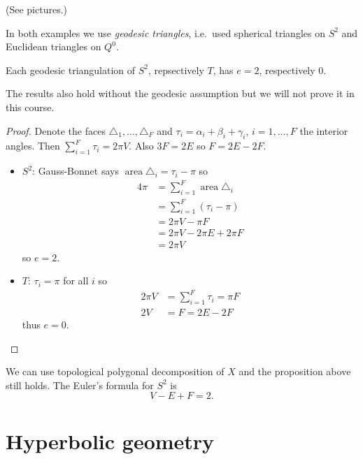 \documentclass[a4paper]{article}
\theoremstyle{definition}
\begin{document}
\begin{eg}
  (See pictures.)

  In both examples we use \emph{geodesic triangles}, i.e.\ used spherical triangles on \(S^2\) and Euclidean triangles on \(Q^0\).
\end{eg}

\begin{proposition}
  Each geodesic triangulation of \(S^2\), repsectively \(T\), has \(e = 2\), respectively \(0\).
\end{proposition}

\begin{remark}
  The results also hold without the geodesic assumption but we will not prove it in this course.
\end{remark}

\begin{proof}
  Denote the faces \(\triangle_1, \dots, \triangle_F\) and \(\tau_i = \alpha_i + \beta_i + \gamma_i\), \(i = 1, \dots, F\) the interior angles. Then \(\sum_{i = 1}^F \tau_i = 2\pi V\). Also \(3F = 2E\) so \(F = 2E - 2F\).
  \begin{itemize}
  \item \(S^2\): Gauss-Bonnet says \(\operatorname{area} \triangle_i = \tau_i - \pi\) so
    \begin{align*}
      4\pi
      &= \sum_{i = 1}^F \operatorname{area} \triangle_i \\
      &= \sum_{i = 1}^F (\tau_i - \pi) \\
      &= 2\pi V - \pi F \\
      &= 2\pi V - 2\pi E + 2\pi F \\
      &= 2\pi V
    \end{align*}
    so \(e = 2\).
  \item \(T\): \(\tau_i = \pi\) for all \(i\) so
    \begin{align*}
      2\pi V &= \sum_{i = 1}^F \tau_i = \pi F \\
      2V &= F = 2 E - 2F
    \end{align*}
    thus \(e = 0\).
  \end{itemize}
\end{proof}

\begin{remark}
  We can use topological polygonal decomposition of \(X\) and the proposition above still holds. The Euler's formula for \(S^2\) is
  \[
    V - E + F = 2.
  \]
\end{remark}

\section{Hyperbolic geometry}
\end{document}
